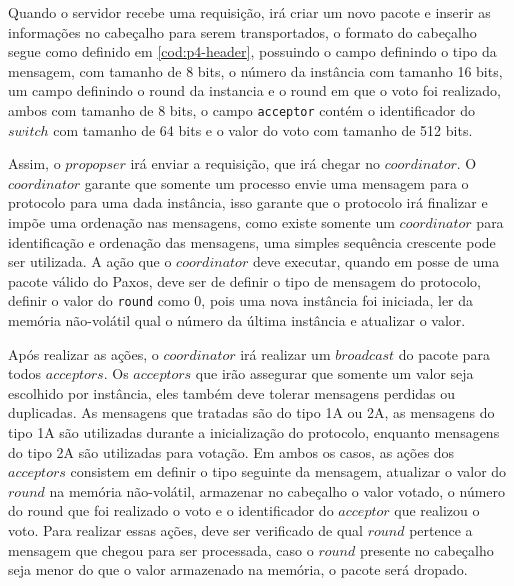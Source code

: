 \documentclass[12pt,
openright, 
oneside,
a4paper,
brazil]{facom-ufu-abntex2}
\theoremstyle{definition}
\begin{document}
Quando o servidor recebe uma requisição, irá criar um novo pacote e inserir as informações no
cabeçalho para serem transportados, o formato do cabeçalho segue como definido em \ref{cod:p4-header}, 
possuindo o campo definindo o tipo da mensagem, com tamanho de 8 bits, o número da instância com tamanho 16 bits,
um campo definindo o round da instancia e o round em que o voto foi realizado, ambos com tamanho de
8 bits, o campo \texttt{acceptor} contém o identificador do $switch$ com tamanho de 64 bits e o valor do
voto com tamanho de 512 bits.



Assim, o $propopser$ irá enviar a requisição, que irá chegar no $coordinator$. O $coordinator$ garante que
somente um processo envie uma mensagem para o protocolo para uma dada instância, isso garante 
que o protocolo irá finalizar e impõe uma ordenação nas mensagens, como existe somente um
$coordinator$ para identificação e ordenação das mensagens, uma simples sequência crescente pode ser
utilizada. A ação que o $coordinator$ deve executar, quando em posse de uma pacote válido do Paxos,
deve ser de definir o tipo de mensagem do protocolo, definir o valor do \texttt{round} como 0, pois
uma nova instância foi iniciada, ler da memória não-volátil qual o número da última instância e atualizar
o valor\citep{dang2016paxos}.




Após realizar as ações, o $coordinator$ irá realizar um $broadcast$ do pacote para todos $acceptors$.
Os $acceptors$ que irão assegurar que somente um valor seja escolhido por instância, eles também deve tolerar
mensagens perdidas ou duplicadas. As mensagens que tratadas são do tipo 1A ou 2A, as mensagens do
tipo 1A são utilizadas durante a inicialização do protocolo, enquanto mensagens do tipo 2A são utilizadas
para votação. Em ambos os casos, as ações dos $acceptors$ consistem em definir o tipo seguinte da mensagem,
atualizar o valor do $round$ na memória não-volátil, armazenar no cabeçalho o valor votado, o número do
round que foi realizado o voto e o identificador do $acceptor$ que realizou o voto. Para realizar
essas ações, deve ser verificado de qual $round$ pertence a mensagem que chegou para ser processada,
caso o $round$ presente no cabeçalho seja menor do que o valor armazenado na memória, o pacote será 
dropado\cite{dang2016paxos}.
\end{document}
